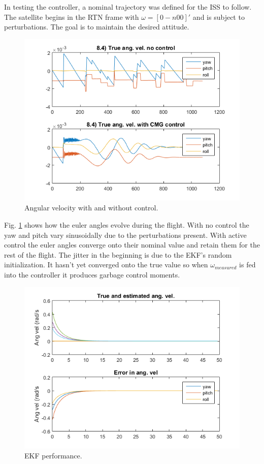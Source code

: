 \documentclass[12pt, letterpaper]{article}
\begin{document}
In testing the controller, a nominal trajectory was defined for the ISS to follow. The satellite begins in the RTN frame with $\omega=[0 -n0 0]'$ and is subject to perturbations. The goal is to maintain the desired attitude.

\begin{figure}[H]
	\centering
	\includegraphics[scale=0.9]{ps8_01}
	\caption{Angular velocity with and without control.}
	\label{8:angvel}
\end{figure}

Fig. \ref{8:angvel} shows how the euler angles evolve during the flight. With no control the yaw and pitch vary sinusoidally due to the perturbations present. With active control the euler angles converge onto their nominal value and retain them for the rest of the flight. The jitter in the beginning is due to the EKF's random initialization. It hasn't yet converged onto the true value so when $\omega_{measured}$ is fed into the controller it produces garbage control moments.

\begin{figure}[H]
	\centering
	\includegraphics[scale=0.9]{ps8_02}
	\caption{EKF performance.}
	\label{8:ekf}
\end{figure}
\end{document}
